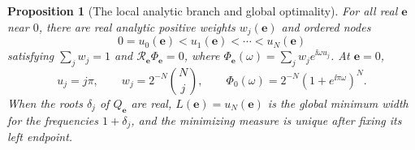 \documentclass[11pt,a4paper]{article}
\newtheorem{proposition}[theorem]{Proposition}
\theoremstyle{remark}\newtheorem{remark}[theorem]{Remark}
\begin{document}
\begin{proposition}[The local analytic branch and global optimality]\label{prop:branch}
For all real $\boldsymbol e$ near $0$, there are real analytic positive weights $w_j(\boldsymbol e)$ and ordered nodes
\[
 0=u_0(\boldsymbol e)<u_1(\boldsymbol e)<\cdots<u_N(\boldsymbol e)
\]
satisfying $\sum_jw_j=1$ and
$\mathcal R_{\boldsymbol e}\Phi_{\boldsymbol e}=0$, where
$\Phi_{\boldsymbol e}(\omega)=\sum_jw_j e^{\ii\omega u_j}$.
At $\boldsymbol e=0$,
\begin{equation}\label{eq:base}
 u_j=j\pi,\qquad w_j=2^{-N}\binom Nj,\qquad
 \Phi_0(\omega)=2^{-N}(1+e^{\ii\pi\omega})^N.
\end{equation}
When the roots $\delta_j$ of $Q_{\boldsymbol e}$ are real, $L(\boldsymbol e)=u_N(\boldsymbol e)$ is the global minimum width for the frequencies $1+\delta_j$, and the minimizing measure is unique after fixing its left endpoint.
\end{proposition}
\end{document}
